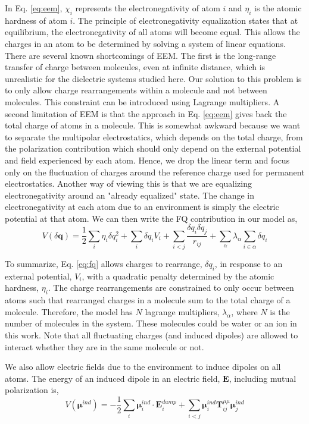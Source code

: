 \documentclass[journal=jacsat,manuscript=article]{achemso}
\begin{document}
In Eq. \ref{eq:eem}, $\chi_i$ represents the electronegativity of atom $i$ and
$\eta_i$ is the atomic hardness of atom $i$. The principle of electronegativity
equalization states that  at equilibrium, the electronegativity of all atoms
will become equal. This allows the charges in an atom to be determined by solving
a system of linear equations. There are several known shortcomings of EEM. The first
is the long-range transfer of charge between molecules, even at infinite distance,
which is unrealistic for the dielectric systems studied here.\cite{chen2007qtpie,chen2008unified}
Our solution to this problem is to only allow charge rearrangements within
a molecule and not between molecules. This constraint can be introduced using
Lagrange multipliers. A second limitation of EEM is that the approach in Eq. \ref{eq:eem}
gives back the total charge of atoms in a molecule. This is somewhat awkward because
we want to separate the multipolar electrostatics, which depends on the total charge,
from the polarization contribution which should only depend on the external potential
and field experienced by each atom. Hence, we drop the linear term and focus only on the
fluctuation of charges around the reference charge used for permanent electrostatics.
Another way of viewing this is that we are equalizing electronegativity around an "already
equalized" state. The change in electronegativity at each atom due to an environment is simply
the electric potential at that atom. We can then write the FQ contribution in our
model as,
\begin{equation}
  V(\delta \bm{q})=\frac12\sum_i \eta_i \delta q_i^2 + \sum_i \delta q_i V_i + \sum_{i<j}\frac{\delta q_i \delta q_j}{r_{ij}} + \sum_{\alpha}\lambda_\alpha \sum_{i\in\alpha}\delta q_{i}
  \label{eq:fq}
\end{equation}

To summarize, Eq. \ref{eq:fq} allows charges to rearrange, $\delta q_i$, in response to an external
potential, $V_i$, with a quadratic penalty determined by the atomic hardness, $\eta_i$.
The charge rearrangements are constrained to only occur between atoms such that rearranged
charges in a molecule sum to the total charge of a molecule. Therefore, the model has $N$ lagrange
multipliers, $\lambda_\alpha$, where $N$ is the number of molecules in the system. These molecules
could be water or an ion in this work. Note that all fluctuating charges (and induced
dipoles) are allowed to interact whether they are in the same molecule or not.

We also allow electric fields due to the environment to induce dipoles on all atoms.
The energy of an induced dipole in an electric field, $\bm{E}$, including mutual polarization is,
\begin{equation}
  V(\bm{\mu}^{ind})=-\frac12\sum_i \bm{\mu}_i^{ind}\cdot \bm{E}_i^{damp} + \sum_{i<j}\bm{\mu}^{ind}_i \bm{T}^{\mu\mu}_{ij}\bm{\mu}^{ind}_j
  \label{eq:induced_dipoles}
\end{equation}
\end{document}
